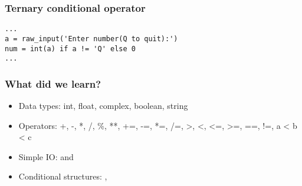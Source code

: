 \documentclass[14pt,compress]{beamer}
\newcommand{\kwrd}[1]{ \texttt{\textbf{\color{blue}{#1}}}  }
\begin{document}
\begin{frame}[fragile]
  \frametitle{Ternary conditional operator}
  \begin{lstlisting}
...
a = raw_input('Enter number(Q to quit):')
num = int(a) if a != 'Q' else 0
...
  \end{lstlisting}
\end{frame}

\begin{frame}[fragile]
  \frametitle{What did we learn?}
  \begin{itemize}
    \item Data types: int, float, complex, boolean, string
    \item Operators: +, -, *, /, \%, **, +=, -=, *=, /=, >, <, <=, >=, ==, !=, a < b < c
    \item Simple IO: \kwrd{raw\_input} and \kwrd{print}
    \item Conditional structures: \kwrd{if/elif/else},\\ \kwrd{C if X else D}
  \end{itemize}
\end{frame}
\end{document}
